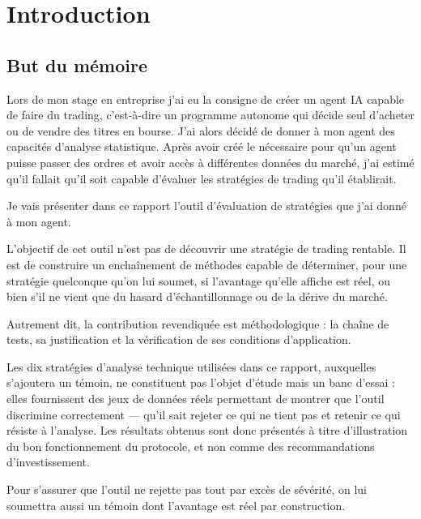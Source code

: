\chapter*{Introduction}
\label{chap:intro}

\section*{But du mémoire}
\label{sec:but}


Lors de mon stage en entreprise j'ai eu la consigne de créer un agent IA capable de faire du trading,
c'est-à-dire un programme autonome qui décide seul d'acheter ou de vendre des titres en bourse.
J'ai alors décidé de donner à mon agent des capacités d'analyse statistique.
Après avoir créé le nécessaire pour qu'un agent puisse passer des ordres et
avoir accès à différentes données du marché, j'ai estimé qu'il fallait qu'il soit capable d'évaluer
les stratégies de trading qu'il établirait.

Je vais présenter dans ce rapport l'outil d'évaluation de stratégies que
j'ai donné à mon agent.

L'objectif de cet outil n'est pas de découvrir une stratégie de trading
rentable. Il est de construire un enchaînement de méthodes capable de
déterminer, pour une stratégie quelconque qu'on lui soumet, si l'avantage
qu'elle affiche est réel, ou bien s'il ne vient que du hasard
d'échantillonnage ou de la dérive du marché.

Autrement dit, la contribution revendiquée est méthodologique :
la chaîne de tests, sa justification et la vérification de ses conditions
d'application. 

Les dix stratégies d'analyse technique utilisées dans ce
rapport, auxquelles s'ajoutera un témoin, ne constituent pas l'objet
d'étude mais un banc d'essai :
elles fournissent des jeux de données réels permettant de
montrer que l'outil discrimine correctement — qu'il sait rejeter
ce qui ne tient pas et retenir ce qui résiste à l'analyse. Les résultats
obtenus sont donc présentés à titre d'illustration du bon
fonctionnement du protocole, et non comme des recommandations
d'investissement.

Pour s'assurer que l'outil ne rejette pas tout par excès de sévérité,
on lui soumettra aussi un témoin dont l'avantage est réel par construction.


